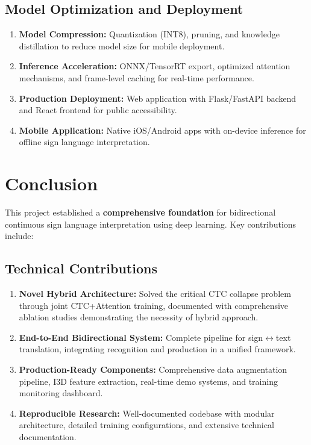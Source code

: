 \documentclass[12pt,a4paper]{article}
\begin{document}
\subsection{Model Optimization and Deployment}

\begin{enumerate}[noitemsep]
    \item \textbf{Model Compression:} Quantization (INT8), pruning, and knowledge distillation to reduce model size for mobile deployment.
    
    \item \textbf{Inference Acceleration:} ONNX/TensorRT export, optimized attention mechanisms, and frame-level caching for real-time performance.
    
    \item \textbf{Production Deployment:} Web application with Flask/FastAPI backend and React frontend for public accessibility.
    
    \item \textbf{Mobile Application:} Native iOS/Android apps with on-device inference for offline sign language interpretation.
\end{enumerate}

\section{Conclusion}

This project established a \textbf{comprehensive foundation} for bidirectional continuous sign language interpretation using deep learning. Key contributions include:

\subsection{Technical Contributions}

\begin{enumerate}[noitemsep]
    \item \textbf{Novel Hybrid Architecture:} Solved the critical CTC collapse problem through joint CTC+Attention training, documented with comprehensive ablation studies demonstrating the necessity of hybrid approach.
    
    \item \textbf{End-to-End Bidirectional System:} Complete pipeline for sign$\leftrightarrow$text translation, integrating recognition and production in a unified framework.
    
    \item \textbf{Production-Ready Components:} Comprehensive data augmentation pipeline, I3D feature extraction, real-time demo systems, and training monitoring dashboard.
    
    \item \textbf{Reproducible Research:} Well-documented codebase with modular architecture, detailed training configurations, and extensive technical documentation.
\end{enumerate}
\end{document}
